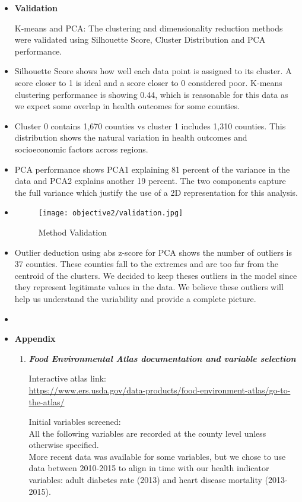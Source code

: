 \documentclass{article}
\begin{document}
\begin{itemize}[leftmargin=0pt]
\item[] \textbf{Validation}

K-means and PCA: The clustering and dimensionality reduction methods were validated using Silhouette Score, Cluster Distribution and PCA performance.
\item[]
Silhouette Score shows how well each data point is assigned to its cluster. A score closer to 1 is ideal and a score closer to 0 considered poor. K-means clustering performance is showing 0.44, which is reasonable for this data as we expect some overlap in health outcomes for some counties.
\item[]
 Cluster 0 contains 1,670 counties vs cluster 1 includes 1,310 counties. This distribution shows the natural variation in health outcomes and socioeconomic factors across regions.
 \item[]
 PCA performance shows PCA1 explaining 81 percent of the variance in the data and PCA2 explains another 19 percent. The two components capture the full variance which justify the use of a 2D representation for this analysis.
\item[]
\begin{figure}[h]
    \centering
    \texttt{[image: objective2/validation.jpg]}
    \caption{Method Validation}
    \label{fig:validation}
\end{figure}
 \item[]
 Outlier deduction using abs z-score for PCA shows the number of outliers is 37 counties. These counties fall to the extremes and are too far from the centroid of the clusters. We decided to keep theses outliers in the model since they represent legitimate values in the data. We believe these outliers will help us understand the variability and provide a complete picture.
 
\pagebreak

\item[] \label{ref:bib} \printbibliography

\pagebreak
\item[] \textbf{Appendix}
\begin{enumerate}
    \item \textbf{\textit{Food Environmental Atlas documentation and variable selection}}
        \label{ref:fea}
        
        Interactive atlas link:\\ \url{https://www.ers.usda.gov/data-products/food-environment-atlas/go-to-the-atlas/}

        Initial variables screened: \\All the following variables are recorded at the county level unless otherwise specified. \\More recent data was available for some variables, but we chose to use data between 2010-2015 to align in time with our health indicator variables: adult diabetes rate (2013) and heart disease mortality (2013-2015).


\end{enumerate}
\end{itemize}
\end{document}
